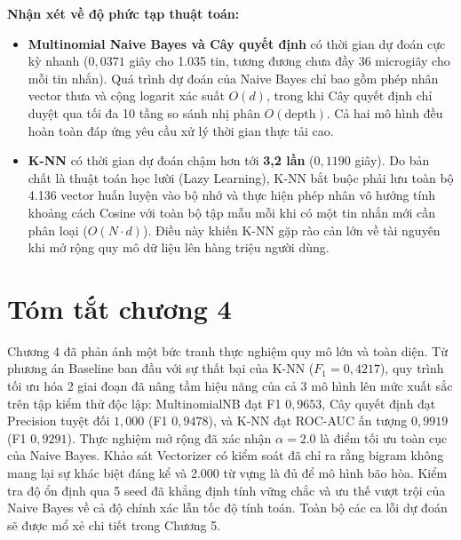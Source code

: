 \textbf{Nhận xét về độ phức tạp thuật toán:}
\begin{itemize}
    \item \textbf{Multinomial Naive Bayes và Cây quyết định} có thời gian dự đoán cực kỳ nhanh ($0,0371$ giây cho 1.035 tin, tương đương chưa đầy 36 microgiây cho mỗi tin nhắn). Quá trình dự đoán của Naive Bayes chỉ bao gồm phép nhân vector thưa và cộng logarit xác suất $O(d)$, trong khi Cây quyết định chỉ duyệt qua tối đa 10 tầng so sánh nhị phân $O(\text{depth})$. Cả hai mô hình đều hoàn toàn đáp ứng yêu cầu xử lý thời gian thực tải cao.
    \item \textbf{K-NN} có thời gian dự đoán chậm hơn tới \textbf{3,2 lần} ($0,1190$ giây). Do bản chất là thuật toán học lười (Lazy Learning), K-NN bắt buộc phải lưu toàn bộ 4.136 vector huấn luyện vào bộ nhớ và thực hiện phép nhân vô hướng tính khoảng cách Cosine với toàn bộ tập mẫu mỗi khi có một tin nhắn mới cần phân loại ($O(N \cdot d)$). Điều này khiến K-NN gặp rào cản lớn về tài nguyên khi mở rộng quy mô dữ liệu lên hàng triệu người dùng.
\end{itemize}

\section{Tóm tắt chương 4}
Chương 4 đã phản ánh một bức tranh thực nghiệm quy mô lớn và toàn diện. Từ phương án Baseline ban đầu với sự thất bại của K-NN ($F_1 = 0,4217$), quy trình tối ưu hóa 2 giai đoạn đã nâng tầm hiệu năng của cả 3 mô hình lên mức xuất sắc trên tập kiểm thử độc lập: MultinomialNB đạt F1 $0,9653$, Cây quyết định đạt Precision tuyệt đối $1,000$ (F1 $0,9478$), và K-NN đạt ROC-AUC ấn tượng $0,9919$ (F1 $0,9291$). Thực nghiệm mở rộng đã xác nhận $\alpha = 2.0$ là điểm tối ưu toàn cục của Naive Bayes. Khảo sát Vectorizer có kiểm soát đã chỉ ra rằng bigram không mang lại sự khác biệt đáng kể và 2.000 từ vựng là đủ để mô hình bão hòa. Kiểm tra độ ổn định qua 5 seed đã khẳng định tính vững chắc và ưu thế vượt trội của Naive Bayes về cả độ chính xác lẫn tốc độ tính toán. Toàn bộ các ca lỗi dự đoán sẽ được mổ xẻ chi tiết trong Chương 5.